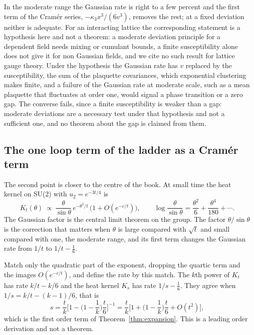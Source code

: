In the moderate range the Gaussian rate is right to a few percent and the first term of the Cram\'er series, $-\kappa_3x^3/(6v^3)$, removes the rest; at a fixed deviation neither is adequate. For an interacting lattice the corresponding statement is a hypothesis here and not a theorem: a moderate deviation principle for a dependent field needs mixing or cumulant bounds, a finite susceptibility alone does not give it for non Gaussian fields, and we cite no such result for lattice gauge theory. Under the hypothesis the Gaussian rate has $v$ replaced by the susceptibility, the sum of the plaquette covariances, which exponential clustering makes finite, and a failure of the Gaussian rate at moderate scale, such as a mean plaquette that fluctuates at order one, would signal a phase transition or a zero gap. The converse fails, since a finite susceptibility is weaker than a gap: moderate deviations are a necessary test under that hypothesis and not a sufficient one, and no theorem about the gap is claimed from them.

\subsection*{The one loop term of the ladder as a Cram\'er term}

The second point is closer to the centre of the book. At small time the heat kernel on SU(2) with $u_2=e^{-3t/4}$ is
\[
K_t(\theta)\ \propto\ \frac{\theta}{\sin\theta}\,e^{-\theta^2/t}\,\big(1+O(e^{-c/t})\big),\qquad\log\frac{\theta}{\sin\theta}=\frac{\theta^2}{6}+\frac{\theta^4}{180}+\cdots .
\]
The Gaussian factor is the central limit theorem on the group. The factor $\theta/\sin\theta$ is the correction that matters when $\theta$ is large compared with $\sqrt t$ and small compared with one, the moderate range, and its first term changes the Gaussian rate from $1/t$ to $1/t-\frac16$.

\begin{remark}\label{rem:cramerloop}
Match only the quadratic part of the exponent, dropping the quartic term and the images $O(e^{-c/t})$, and define the rate by this match. The $k$th power of $K_t$ has rate $k/t-k/6$ and the heat kernel $K_s$ has rate $1/s-\frac16$. They agree when $1/s=k/t-(k-1)/6$, that is
\[
s=\frac{t}{k}\Big[1-\Big(1-\frac1k\Big)\frac t6\Big]^{-1}=\frac tk\Big[1+\Big(1-\frac1k\Big)\frac t6+O(t^2)\Big],
\]
which is the first order term of Theorem~\ref{thm:expansion}. This is a leading order derivation and not a theorem.
\end{remark}


